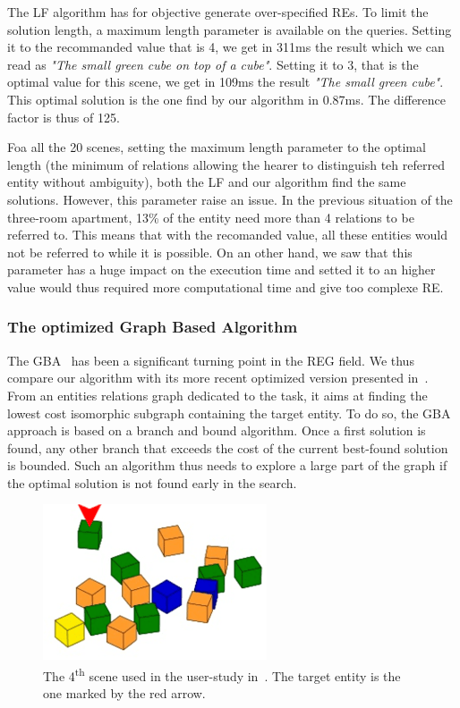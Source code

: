 The LF algorithm has for objective generate over-specified REs. To limit the solution length, a maximum length parameter is available on the queries. Setting it to the recommanded value that is 4, we get in 311ms the result which we can read as \textit{"The small green cube on top of a cube"}. Setting it to 3, that is the optimal value for this scene, we get in 109ms the result \textit{"The small green cube"}. This optimal solution is the one find by our algorithm in 0.87ms. The difference factor is thus of 125.

Foa all the 20 scenes, setting the maximum length parameter to the optimal length (the minimum of relations allowing the hearer to distinguish teh referred entity without ambiguity), both the LF and our algorithm find the same solutions. However, this parameter raise an issue. In the previous situation of the three-room apartment, 13\% of the entity need more than 4 relations to be referred to. This means that with the recomanded value, all these entities would not be referred to while it is possible. On an other hand, we saw that this parameter has a huge impact on the execution time and setted it to an higher value would thus required more computational time and give too complexe RE.

\subsubsection{The optimized Graph Based Algorithm}

The GBA~\cite{viethen_2013_graphs} has been a significant turning point in the REG field. We thus compare our algorithm with its more recent optimized version presented in~\cite{li_2017_automatically}. From an entities relations graph dedicated to the task, it aims at finding the lowest cost isomorphic subgraph containing the target entity. To do so, the GBA approach is based on a branch and bound algorithm. Once a first solution is found, any other branch that exceeds the cost of the current best-found solution is bounded. Such an algorithm thus needs to explore a large part of the graph if the optimal solution is not found early in the search.

\begin{figure}[h!]
\centering
\includegraphics[scale=0.7]{figures/chapter4/GBA.png}
\caption{\label{fig:chap4_gba} The 4\textsuperscript{th} scene used in the user-study in~\cite{li_2016_spatial}. The target entity is the one marked by the red arrow.}
\end{figure}


